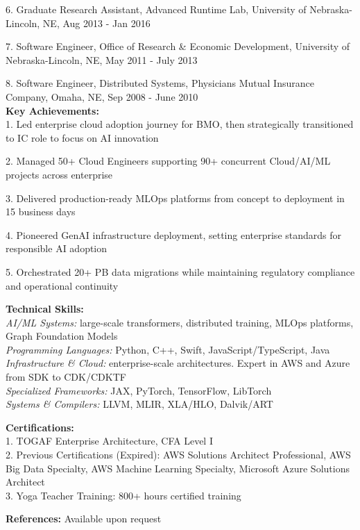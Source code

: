\documentclass[10pt,letterpaper]{article}
\begin{document}
6. Graduate Research Assistant, Advanced Runtime Lab, University of Nebraska-Lincoln, NE, Aug 2013 - Jan 2016

7. Software Engineer, Office of Research \& Economic Development, University of Nebraska-Lincoln, NE, May 2011 - July 2013

8. Software Engineer, Distributed Systems, Physicians Mutual Insurance Company, Omaha, NE, Sep 2008 - June 2010\\

\textbf{Key Achievements:} \\
1. Led enterprise cloud adoption journey for BMO, then strategically transitioned to IC role to focus on AI innovation

2. Managed 50+ Cloud Engineers supporting 90+ concurrent Cloud/AI/ML projects across enterprise

3. Delivered production-ready MLOps platforms from concept to deployment in 15 business days

4. Pioneered GenAI infrastructure deployment, setting enterprise standards for responsible AI adoption

5. Orchestrated 20+ PB data migrations while maintaining regulatory compliance and operational continuity

\textbf{Technical Skills:} \\
\textit{AI/ML Systems:} large-scale transformers, distributed training, MLOps platforms, Graph Foundation Models \\
\textit{Programming Languages:} Python, C++, Swift, JavaScript/TypeScript, Java \\
\textit{Infrastructure \& Cloud:} enterprise-scale architectures. Expert in AWS and Azure from SDK to CDK/CDKTF \\
\textit{Specialized Frameworks:} JAX, PyTorch, TensorFlow, LibTorch \\
\textit{Systems \& Compilers:} LLVM, MLIR, XLA/HLO, Dalvik/ART 

\textbf{Certifications:} \\
1. TOGAF Enterprise Architecture, CFA Level I\\
2. Previous Certifications (Expired): AWS Solutions Architect Professional, AWS Big Data Specialty, AWS Machine Learning Specialty, Microsoft Azure Solutions Architect\\
3. Yoga Teacher Training: 800+ hours certified training

\textbf{References:} Available upon request
\end{document}
